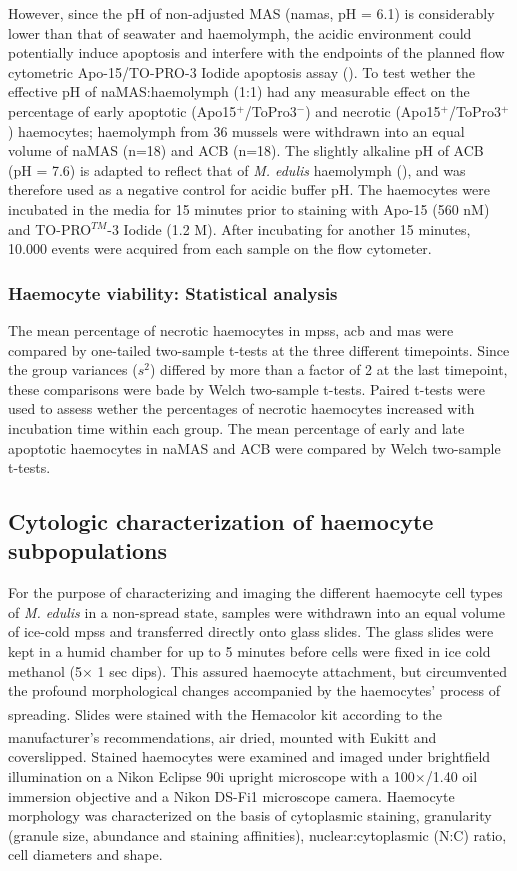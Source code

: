 However, since the pH of non-adjusted MAS (\acrshort{namas}, pH = 6.1) is considerably lower than that of seawater and haemolymph, the acidic environment could potentially induce apoptosis and interfere with the endpoints of the planned flow cytometric Apo-15/TO-PRO-3 Iodide apoptosis assay (\cite{Wang2016}). To test wether the effective pH of naMAS:haemolymph (1:1) had any measurable effect on the percentage of early apoptotic (Apo15$^{+}$/ToPro3$^{-}$) and necrotic (Apo15$^{+}$/ToPro3$^{+}$) haemocytes; haemolymph from 36 mussels were withdrawn into an equal volume of naMAS (n=18) and ACB (n=18). The slightly alkaline pH of ACB (pH = 7.6) is adapted to reflect that of \emph{M. edulis} haemolymph (\cite{Pipe1997, Mangan2019}), and was therefore used as a negative control for acidic buffer pH. The haemocytes were incubated in the media for 15 minutes prior to staining with Apo-15 (560 nM) and TO-PRO$^{TM}$-3 Iodide (1.2 \micro M). After incubating for another 15 minutes, 10.000 events were acquired from each sample on the flow cytometer.

\subsubsection{Haemocyte viability: Statistical analysis}
The mean percentage of necrotic haemocytes in \acrshort{mpss}, \acrshort{acb} and \acrshort{mas} were compared by one-tailed two-sample t-tests at the three different timepoints. Since the group variances ($s^{2}$) differed by more than a factor of 2 at the last timepoint, these comparisons were bade by Welch two-sample t-tests. Paired t-tests were used to assess wether the percentages of necrotic haemocytes increased with incubation time within each group. The mean percentage of early and late apoptotic haemocytes in naMAS and ACB were compared by Welch two-sample t-tests.

\subsection{Cytologic characterization of haemocyte subpopulations}
\label{subsection:morph}
For the purpose of characterizing and imaging the different haemocyte cell types of \emph{M. edulis} in a non-spread state, samples were withdrawn into an equal volume of ice-cold \acrshort{mpss} and transferred directly onto glass slides. The glass slides were kept in a humid chamber for up to 5 minutes before cells were fixed in ice cold methanol (5$\times$ 1 sec dips). This assured haemocyte attachment, but circumvented the profound morphological changes accompanied by the haemocytes’ process of spreading. Slides were stained with the Hemacolor\textsuperscript{\textregistered} kit according to the manufacturer’s recommendations, air dried, mounted with Eukitt\textsuperscript{\textregistered} and coverslipped. Stained haemocytes were examined and imaged under brightfield illumination on a Nikon Eclipse 90i upright microscope with a 100$\times$/1.40 oil immersion objective and a Nikon DS-Fi1 microscope camera. Haemocyte morphology was characterized on the basis of cytoplasmic staining, granularity (granule size, abundance and staining affinities), nuclear:cytoplasmic (N:C) ratio, cell diameters and shape. 

